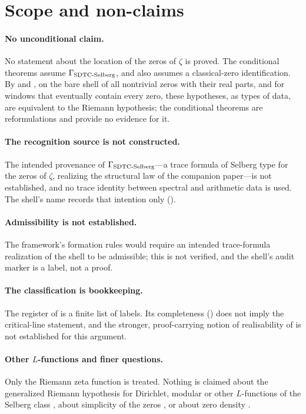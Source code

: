 \section{Scope and non-claims}
\label{sec:scope_and_nonclaims}

\paragraph{No unconditional claim.}
No statement about the location of the zeros of \(\zeta\) is proved.
The conditional theorems assume \(\Gamma_{\mathrm{SDTC\text{-}Selberg}}\), and
 also assumes a classical-zero
identification.  By  and
, on the bare shell of all nontrivial zeros with their real parts, and
for windows that eventually
contain every zero, these hypotheses, as types of data, are equivalent
to the Riemann hypothesis; the conditional theorems
are reformulations and provide no evidence for it.

\paragraph{The recognition source is not constructed.}
The intended provenance of \(\Gamma_{\mathrm{SDTC\text{-}Selberg}}\)---a trace formula of
Selberg type for the zeros of \(\zeta\), realizing the structural law
of the companion paper---is not established, and no trace identity
between spectral and arithmetic data is used.  The shell's name
records that intention only ().

\paragraph{Admissibility is not established.}
The framework's formation rules \citep{TsiokosFoundationsII2026} would
require an intended trace-formula realization of the shell to be
admissible; this is not verified, and the shell's audit marker is a
label, not a proof.

\paragraph{The classification is bookkeeping.}
The register of  is a finite list of labels.
Its completeness () does not imply the
critical-line statement, and the stronger, proof-carrying notion of
realisability of \citet{TsiokosAOR2026} is not established for this
argument.

\paragraph{Other \(L\)-functions and finer questions.}
Only the Riemann zeta function is treated.  Nothing is claimed about
the generalized Riemann hypothesis for Dirichlet, modular or other
\(L\)-functions of the Selberg class
\citep{Selberg1992,KaczorowskiPerelli1999}, about simplicity of the
zeros \citep{Montgomery1973,ConreyGhoshGonek1998}, or about zero
density \citep{Montgomery1971,Ivic1985}.
